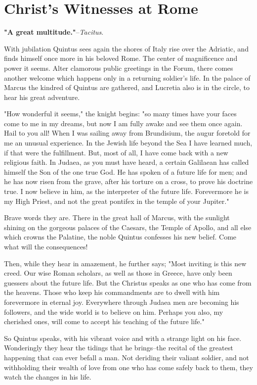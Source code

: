 \chapter*{Christ's Witnesses at Rome}
\textbf{"A great multitude."}--\textit{Tacitus}.


With jubilation Quintus sees again the shores of Italy rise over
the Adriatic, and finds himself once more in his beloved Rome.  The
center of magnificence and power it seems.  Alter clamorous public
greetings in the Forum, there comes another welcome which happens
only in a returning soldier's life.  In the palace of Marcus the
kindred of Quintus are gathered, and Lucretia also is in the
circle, to hear his great adventure.

"How wonderful it seems," the knight begins: "so many times have
your faces come to me in my dreams, but now I am fully awake and
see them once again.  Hail to you all!  When I was sailing away
from Brundisium, the augur foretold for me an unusual experience.
In the Jewish life beyond the Sea I have learned much, if that were
the fulfillment.  But, most of all, I have come back with a new
religious faith.  In Judaea, as you must have heard, a certain
Galilaean has called himself the Son of the one true God.  He has
spoken of a future life for men; and he has now risen from the
grave, after his torture on a cross, to prove his doctrine true.  I
now believe in him, as the interpreter of the future life.
Forevermore he is my High Priest, and not the great pontifex in the
temple of your Jupiter."

Brave words they are.  There in the great hall of Marcus, with the
sunlight shining on the gorgeous palaces of the Caesars, the Temple
of Apollo, and all else which crowns the Palatine, the noble
Quintus confesses his new belief.  Come what will the consequences!

Then, while they hear in amazement, he further says; "Most inviting
is this new creed.  Our wise Roman scholars, as well as those in
Greece, have only been guessers about the future life.  But the
Christus speaks as one who has come from the heavens.  Those who
keep his commandments are to dwell with him forevermore in eternal
joy.  Everywhere through Judaea men are becoming his followers, and
the wide world is to believe on him.  Perhaps you also, my
cherished ones, will come to accept his teaching of the future
life."

So Quintus speaks, with his vibrant voice and with a strange light
on his face.  Wonderingly they hear the tidings that he brings--the
recital of the greatest happening that can ever befall a man.  Not
deriding their valiant soldier, and not withholding their wealth of
love from one who has come safely back to them, they watch the
changes in his life.

